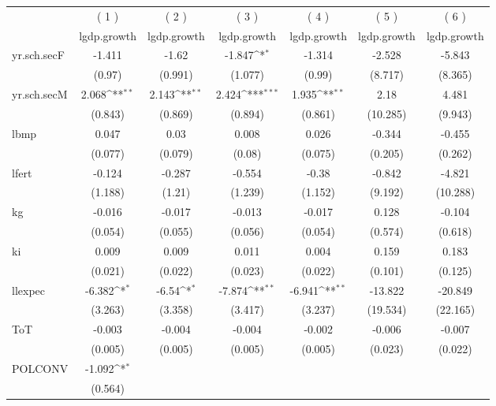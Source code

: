 \documentclass{article}\usepackage{graphicx, color}
\begin{document}
\def\sym#1{\ifmmode^{#1}\else\(^{#1}\)\fi}
\begin{table}
\centering
\small
\begin{tabular}{l*{6}{c}}
\hline\hline
	 &\multicolumn{1}{c}{( 1 )}  	 &\multicolumn{1}{c}{( 2 )}  	 &\multicolumn{1}{c}{( 3 )}  	 &\multicolumn{1}{c}{( 4 )}  	 &\multicolumn{1}{c}{( 5 )}  	 &\multicolumn{1}{c}{( 6 )}  \\  &\multicolumn{1}{c}{lgdp.growth} &\multicolumn{1}{c}{lgdp.growth} &\multicolumn{1}{c}{lgdp.growth} &\multicolumn{1}{c}{lgdp.growth} &\multicolumn{1}{c}{lgdp.growth} &\multicolumn{1}{c}{lgdp.growth} \\
\hline
yr.sch.secF 		&-1.411 		&-1.62 		&-1.847\sym{*} 		&-1.314 		&-2.528 		&-5.843 \\
  		&(0.97) 		&(0.991) 		&(1.077) 		&(0.99) 		&(8.717) 		&(8.365) \\
yr.sch.secM 		&2.068\sym{**} 		&2.143\sym{**} 		&2.424\sym{***} 		&1.935\sym{**} 		&2.18 		&4.481 \\
  		&(0.843) 		&(0.869) 		&(0.894) 		&(0.861) 		&(10.285) 		&(9.943) \\
lbmp 		&0.047 		&0.03 		&0.008 		&0.026 		&-0.344 		&-0.455 \\
  		&(0.077) 		&(0.079) 		&(0.08) 		&(0.075) 		&(0.205) 		&(0.262) \\
lfert 		&-0.124 		&-0.287 		&-0.554 		&-0.38 		&-0.842 		&-4.821 \\
  		&(1.188) 		&(1.21) 		&(1.239) 		&(1.152) 		&(9.192) 		&(10.288) \\
kg 		&-0.016 		&-0.017 		&-0.013 		&-0.017 		&0.128 		&-0.104 \\
  		&(0.054) 		&(0.055) 		&(0.056) 		&(0.054) 		&(0.574) 		&(0.618) \\
ki 		&0.009 		&0.009 		&0.011 		&0.004 		&0.159 		&0.183 \\
  		&(0.021) 		&(0.022) 		&(0.023) 		&(0.022) 		&(0.101) 		&(0.125) \\
llexpec 		&-6.382\sym{*} 		&-6.54\sym{*} 		&-7.874\sym{**} 		&-6.941\sym{**} 		&-13.822 		&-20.849 \\
  		&(3.263) 		&(3.358) 		&(3.417) 		&(3.237) 		&(19.534) 		&(22.165) \\
ToT 		&-0.003 		&-0.004 		&-0.004 		&-0.002 		&-0.006 		&-0.007 \\
  		&(0.005) 		&(0.005) 		&(0.005) 		&(0.005) 		&(0.023) 		&(0.022) \\
POLCONV 		&-1.092\sym{*} 		& 		& 		& 		& 		& \\
  		&(0.564) 		& 		& 		& 		& 		& \\

\end{tabular}
\end{table}
\end{document}
